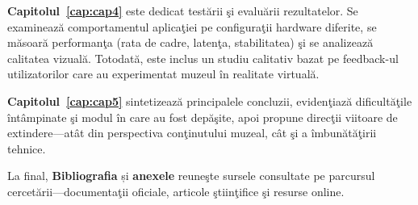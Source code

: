 \smallskip
\noindent\textbf{Capitolul~\ref{cap:cap4}} este dedicat testării şi evaluării rezultatelor. Se examinează comportamentul aplicaţiei pe configuraţii hardware diferite, se măsoară performanţa (rata de cadre, latenţa, stabilitatea) şi se analizează calitatea vizuală. Totodată, este inclus un studiu calitativ bazat pe feedback-ul utilizatorilor care au experimentat muzeul în realitate virtuală.

\smallskip
\noindent\textbf{Capitolul~\ref{cap:cap5}} sintetizează principalele concluzii, evidenţiază dificultăţile întâmpinate şi modul în care au fost depăşite, apoi propune direcţii viitoare de extindere—atât din perspectiva conţinutului muzeal, cât şi a îmbunătăţirii tehnice.

\smallskip
La final, \textbf{Bibliografia} și \textbf{anexele} reuneşte sursele consultate pe parcursul cercetării—documentaţii oficiale, articole ştiinţifice şi resurse online.
